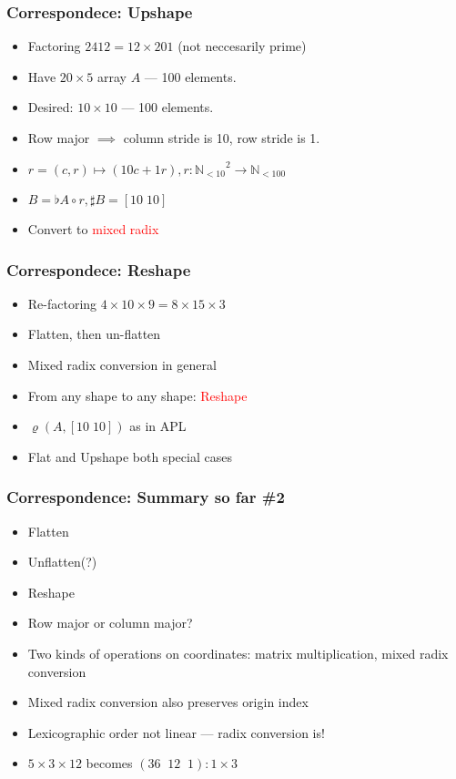 \documentclass[xetex,mathserif,serif]{beamer}
\newcommand\Nat{\mathbb{N}}
\newcommand\NB[1]{\textcolor{red}{#1}}
\begin{document}
\begin{frame}
  \frametitle{Correspondece: Upshape} 
  \pause
  \begin{itemize}[<+->]
    \item Factoring \(2412 = 12 \times 201\) (not neccesarily prime)
    \item Have \(20\times 5\) array \(A\) --- 100 elements.
    \item Desired: \(10 \times 10\) --- 100 elements.
    \item Row major \(\implies\) column stride is 10, row stride is 1.
    \item \(r = (c, r)\mapsto (10c + 1r), r : {\Nat_{<10}}^2 \to \Nat_{<100}\)
    \item \(B = \flat A \circ r, \sharp B = [10\;10]\)
    \item Convert to \NB{mixed radix}
  \end{itemize}
\end{frame}


\begin{frame}
  \frametitle{Correspondece: Reshape}
  \pause
  \begin{itemize}[<+->]
    \item Re-factoring \(4\times 10 \times 9 = 8 \times 15 \times 3\)
    \item Flatten, then un-flatten
    \item Mixed radix conversion in general
    \item From any shape to any shape: \NB{Reshape}
    \item \(\varrho(A, [10\;10])\) as in APL
    \item Flat and Upshape both special cases
  \end{itemize}
\end{frame}

\begin{frame}
  \frametitle{Correspondence: Summary so far \#2}
  \pause
  \begin{itemize}[<+->]
    \item Flatten
    \item Unflatten(?)
    \item Reshape
    \item Row major or column major?
    \item Two kinds of operations on coordinates: matrix multiplication, mixed radix conversion
    \item Mixed radix conversion also preserves origin index
    \item Lexicographic order not linear --- radix conversion is!
    \item \(5\times3\times12\) becomes \((36\;\;12\;\;1) : 1 \times 3\)
  \end{itemize}
\end{frame}
\end{document}
